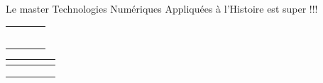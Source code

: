 \documentclass[12pt]{article}
\newcommand{\tnah}{Technologies Numériques Appliquées à l'Histoire }
\begin{document}
Le master \tnah est super !!!

\begin{tabular}{|p{3cm}|c|c|c|}
	\hline
	&  &  &  \\
	\hline
	&  &  &  \\
	\hline
	&  &  &  \\
	\hline
	&  &  &  \\
	\hline
	&  &  &  \\
	\hline
	&  &  &  \\
	\hline
	&  &  &  \\
	\hline
\end{tabular}

\begin{tabular}{|c|c|c|c|c|}
	\hline
	\multicolumn{2}{|c|}{} &  &  &  \\
	\hline
	&  &  &  &  \\
	\hline
	&  &  &  &  \\
	\hline
	&  &  &  &  \\
	\hline
\end{tabular}
\end{document}
